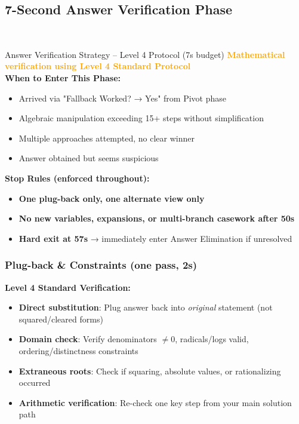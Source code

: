 \documentclass{article}
\begin{document}
\hypertarget{answer-verify}{}
\subsection{7-Second Answer Verification Phase}
{\footnotesize\textcolor{timegreen}{}}\\

\begin{classifybox}{Answer Verification Strategy -- Level 4 Protocol (7s budget)}
{\footnotesize\textcolor{timegreen}{}}\quad\textbf{\textcolor{orange}{Mathematical verification using Level 4 Standard Protocol}}\\
\textbf{When to Enter This Phase:}
\begin{itemize}[nosep]
\item Arrived via "Fallback Worked? → Yes" from Pivot phase
\item Algebraic manipulation exceeding 15+ steps without simplification
\item Multiple approaches attempted, no clear winner
\item Answer obtained but seems suspicious
\end{itemize}

\textbf{Stop Rules (enforced throughout):}
\begin{itemize}[nosep]
\item \textbf{One plug-back only, one alternate view only}
\item \textbf{No new variables, expansions, or multi-branch casework after 50s}
\item \textbf{Hard exit at 57s} → immediately enter Answer Elimination if unresolved
\end{itemize}

\subsubsection{Plug-back \& Constraints (one pass, 2s)}
{\footnotesize\textcolor{timegreen}{}}

\textbf{Level 4 Standard Verification:}
\begin{itemize}[nosep]
\item \textbf{Direct substitution}: Plug answer back into \emph{original} statement (not squared/cleared forms)
\item \textbf{Domain check}: Verify denominators $\neq 0$, radicals/logs valid, ordering/distinctness constraints
\item \textbf{Extraneous roots}: Check if squaring, absolute values, or rationalizing occurred
\item \textbf{Arithmetic verification}: Re-check one key step from your main solution path
\end{itemize}


\end{classifybox}
\end{document}
